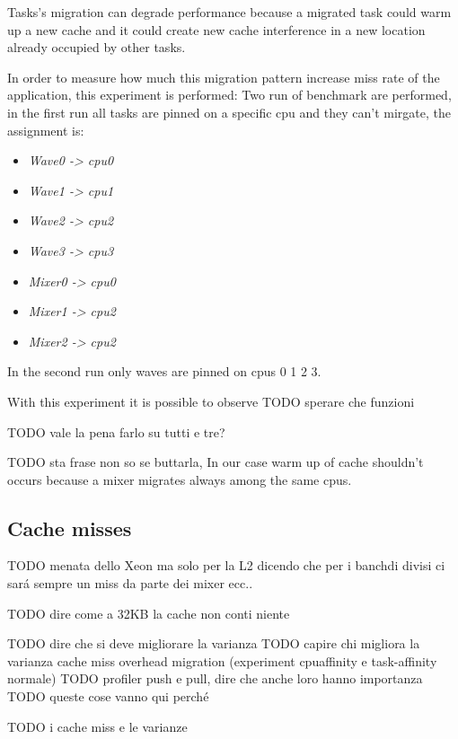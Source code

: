 Tasks's migration can degrade performance because a migrated task could warm up a new cache and it could create new cache interference in a new location 
already occupied by other tasks. 

In order to measure how much this migration pattern increase miss rate of the application, this experiment is performed:
Two run of benchmark are performed, in the first run all tasks are pinned on a specific cpu and they can't mirgate, the assignment is: 

\begin{itemize}
\item \textit{Wave0 -> cpu0}
\item \textit{Wave1 -> cpu1}
\item \textit{Wave2 -> cpu2}
\item \textit{Wave3 -> cpu3}
\item \textit{Mixer0 -> cpu0}
\item \textit{Mixer1 -> cpu2}
\item \textit{Mixer2 -> cpu2}
\end{itemize}

In the second run only waves are pinned on cpus 0 1 2 3. 

With this experiment it is possible to observe  TODO sperare che funzioni

TODO vale la pena farlo su tutti e tre?

TODO sta frase non so se buttarla, In our case warm up of cache shouldn't occurs because a mixer migrates always among the same cpus.

\subsection{Cache misses}

TODO menata dello Xeon ma solo per la L2 dicendo che per i banchdi divisi ci sar\'a sempre un miss da parte dei mixer ecc..

TODO dire come a 32KB la cache non conti niente


TODO dire che si deve migliorare la varianza
TODO capire chi migliora la varianza cache miss overhead migration (experiment cpuaffinity e task-affinity normale)
TODO profiler push e pull, dire che anche loro hanno importanza
TODO queste cose vanno qui perch\'e 


TODO i cache miss e le varianze

